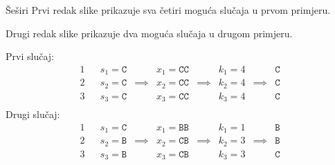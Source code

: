 \begin{statement}[
  problempoints=100,
  timelimit=1 sekunda,
  memorylimit=512 MiB,
]{Šeširi}
Prvi redak slike prikazuje sva četiri moguća slučaja u prvom primjeru.

Drugi redak slike prikazuje dva moguća slučaja u drugom primjeru.

Prvi slučaj:
$$
\begin{array}{lccccccccc}
    1 & & s_1 = \texttt{C} &          & x_1 = \texttt{CC} &          & k_1 = 4 &          & \texttt{C} \\
    2 & & s_2 = \texttt{C} & \implies & x_2 = \texttt{CC} & \implies & k_2 = 4 & \implies & \texttt{C} \\
    3 & & s_3 = \texttt{C} &          & x_3 = \texttt{CC} &          & k_3 = 4 &          & \texttt{C} \\
\end{array}
$$
Drugi slučaj:
$$
\begin{array}{lccccccccc}
    1 & & s_1 = \texttt{C} &          & x_1 = \texttt{BB} &          & k_1 = 1 &          & \texttt{B} \\
    2 & & s_2 = \texttt{B} & \implies & x_2 = \texttt{CB} & \implies & k_2 = 3 & \implies & \texttt{B} \\
    3 & & s_3 = \texttt{B} &          & x_3 = \texttt{CB} &          & k_3 = 3 &          & \texttt{C} \\
\end{array}
$$


\end{statement}

